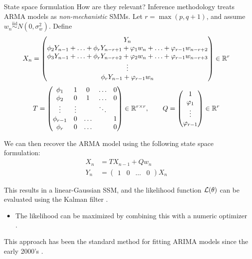 \documentclass[aspectratio=169]{beamer}\usepackage[]{graphicx}\usepackage[]{xcolor}
\begin{document}
\begin{frame}[allowframebreaks]{State space formulation}
  How are they relevant? Inference methodology treats $\mathrm{ARMA}$ models as \emph{non-mechanistic} SMMs. Let $r = \max(p, q+1)$, and assume $w_n \overset{\mathrm{iid}}{\sim} N(0, \sigma^2_w)$. Define
  \begin{equation*}
    X_n = \begin{pmatrix}
  Y_n \\
  \phi_2 Y_{n - 1} + \ldots + \phi_r Y_{n - r + 1} + \varphi_{1}w_{n} + \ldots + \varphi_{r - 1}w_{n - r + 2} \\
    \phi_3 Y_{n - 1} + \ldots + \phi_r Y_{n - r + 2} + \varphi_{2}w_{n} + \ldots + \varphi_{r - 1}w_{n - r + 3} \\
    \vdots \\
    \phi_r Y_{n - 1} + \varphi_{r - 1}w_n
  \end{pmatrix} \in \mathbb{R}^r
  \end{equation*}
  \begin{equation*}
  T = \begin{pmatrix}
\phi_1 & 1 & 0 & \ldots & 0 \\
\phi_2 & 0 & 1 & \ldots & 0 \\
\vdots & \vdots & & \ddots & \\
\phi_{r-1} & 0 & \ldots &  & 1 \\
\phi_r & 0 & \ldots & & 0
\end{pmatrix} \in \mathbb{R}^{r \times r}, \quad\quad
Q = \begin{pmatrix}
  1 \\ \varphi_1 \\ \vdots \\ \varphi_{r - 1}
\end{pmatrix} \in \mathbb{R}^r
  \end{equation*}

We can then recover the $\mathrm{ARMA}$ model using the following state space formulation:
\begin{align*}
  X_n &= TX_{n - 1} + Qw_n \\
  Y_n &= \begin{pmatrix} 1 & 0 & \ldots & 0\end{pmatrix} X_n
\end{align*}

This results in a linear-Gaussian SSM, and the likelihood function $\mathcal{L}(\theta)$ can be evaluated using the Kalman filter \citep{kalman60}.
\begin{itemize}
  \item The likelihood can be maximized by combining this with a numeric optimizer \citep{gardner1980}.
\end{itemize}

This approach has been the standard method for fitting ARIMA models since the early 2000's \citep{ripley2002}. 

\end{frame}
\end{document}
